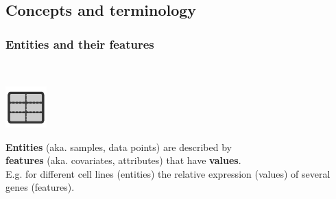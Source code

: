 \documentclass[aspectratio=169]{beamer}
\begin{document}
\subsection{Concepts and terminology}

\begin{frame}{}
   \tableofcontents[currentsection]
\end{frame}

\begin{frame}
  \frametitle{Entities and their features}  
  \begin{block}{}
    \vspace{0.5cm}
    \ \ \ \
    \begin{minipage}{0.10\textwidth}
      \begin{center}
        \includegraphics[width=1.6cm]{images/publicdomainvectors_ftdissociatecell.pdf}
      \end{center}        
    \end{minipage}
    \hfill
    \begin{minipage}{0.80\textwidth}

      \textbf{Entities} (aka. samples, data points) are described by \\
      \textbf{features} (aka.  covariates, attributes) that have
      \textbf{values}.\\

      E.g. for different cell lines (entities) the relative expression
      (values) of several genes (features).
      
    \end{minipage}
    \vspace{0.3cm}
  \end{block}
\end{frame}
\end{document}
